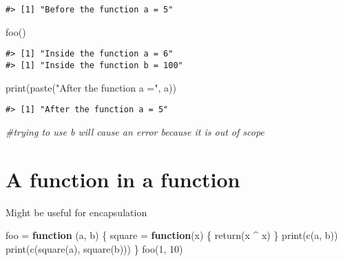 \documentclass[
]{book}
\newenvironment{Shaded}{\begin{snugshade}}{\end{snugshade}}
\newcommand{\CommentTok}[1]{\textcolor[rgb]{0.56,0.35,0.01}{\textit{#1}}}
\newcommand{\ControlFlowTok}[1]{\textcolor[rgb]{0.13,0.29,0.53}{\textbf{#1}}}
\newcommand{\DecValTok}[1]{\textcolor[rgb]{0.00,0.00,0.81}{#1}}
\newcommand{\FunctionTok}[1]{\textcolor[rgb]{0.00,0.00,0.00}{#1}}
\newcommand{\NormalTok}[1]{#1}
\newcommand{\OtherTok}[1]{\textcolor[rgb]{0.56,0.35,0.01}{#1}}
\newcommand{\SpecialCharTok}[1]{\textcolor[rgb]{0.00,0.00,0.00}{#1}}
\newcommand{\StringTok}[1]{\textcolor[rgb]{0.31,0.60,0.02}{#1}}
\begin{document}
\begin{verbatim}
#> [1] "Before the function a = 5"
\end{verbatim}

\begin{Shaded}
\begin{Highlighting}[]
\FunctionTok{foo}\NormalTok{()}
\end{Highlighting}
\end{Shaded}

\begin{verbatim}
#> [1] "Inside the function a = 6"
#> [1] "Inside the function b = 100"
\end{verbatim}

\begin{Shaded}
\begin{Highlighting}[]
\FunctionTok{print}\NormalTok{(}\FunctionTok{paste}\NormalTok{(}\StringTok{"After the function a ="}\NormalTok{, a))}
\end{Highlighting}
\end{Shaded}

\begin{verbatim}
#> [1] "After the function a = 5"
\end{verbatim}

\begin{Shaded}
\begin{Highlighting}[]
\CommentTok{\#trying to use \textasciigrave{}b\textasciigrave{} will cause an error because it is out of scope}
\end{Highlighting}
\end{Shaded}

\hypertarget{a-function-in-a-function}{%
\section{A function in a function}\label{a-function-in-a-function}}

Might be useful for encapsulation

\begin{Shaded}
\begin{Highlighting}[]
\NormalTok{foo }\OtherTok{=} \ControlFlowTok{function}\NormalTok{ (a, b) \{}
\NormalTok{  square }\OtherTok{=} \ControlFlowTok{function}\NormalTok{(x) \{}
    \FunctionTok{return}\NormalTok{(x }\SpecialCharTok{\^{}}\NormalTok{ x)}
\NormalTok{  \}}
  \FunctionTok{print}\NormalTok{(}\FunctionTok{c}\NormalTok{(a, b))}
  \FunctionTok{print}\NormalTok{(}\FunctionTok{c}\NormalTok{(}\FunctionTok{square}\NormalTok{(a), }\FunctionTok{square}\NormalTok{(b)))}
\NormalTok{\}}
\FunctionTok{foo}\NormalTok{(}\DecValTok{1}\NormalTok{, }\DecValTok{10}\NormalTok{)}
\end{Highlighting}
\end{Shaded}
\end{document}
